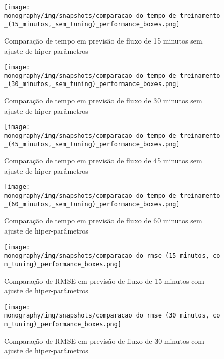 \begin{figure}[htbp]
    \centering
    \texttt{[image: monography/img/snapshots/comparacao\_do\_tempo\_de\_treinamento\_(15\_minutos,\_sem\_tuning)\_performance\_boxes.png]}
    \label{figure:comparacao_previsao_tempo_15_sem_tuning}
    \caption{Comparação de tempo em previsão de fluxo de 15 minutos sem ajuste de hiper-parâmetros}
\end{figure}

\begin{figure}[htbp]
    \centering
    \texttt{[image: monography/img/snapshots/comparacao\_do\_tempo\_de\_treinamento\_(30\_minutos,\_sem\_tuning)\_performance\_boxes.png]}
    \label{figure:comparacao_previsao_tempo_30_sem_tuning}
    \caption{Comparação de tempo em previsão de fluxo de 30 minutos sem ajuste de hiper-parâmetros}
\end{figure}

\begin{figure}[htbp]
    \centering
    \texttt{[image: monography/img/snapshots/comparacao\_do\_tempo\_de\_treinamento\_(45\_minutos,\_sem\_tuning)\_performance\_boxes.png]}
    \label{figure:comparacao_previsao_tempo_45_sem_tuning}
    \caption{Comparação de tempo em previsão de fluxo de 45 minutos sem ajuste de hiper-parâmetros}
\end{figure}

\begin{figure}[htbp]
    \centering
    \texttt{[image: monography/img/snapshots/comparacao\_do\_tempo\_de\_treinamento\_(60\_minutos,\_sem\_tuning)\_performance\_boxes.png]}
    \label{figure:comparacao_previsao_tempo_60_sem_tuning}
    \caption{Comparação de tempo em previsão de fluxo de 60 minutos sem ajuste de hiper-parâmetros}
\end{figure}

\begin{figure}[htbp]
    \centering
    \texttt{[image: monography/img/snapshots/comparacao\_do\_rmse\_(15\_minutos,\_com\_tuning)\_performance\_boxes.png]}
    \label{figure:comparacao_previsao_rmse_15_com_tuning}
    \caption{Comparação de RMSE em previsão de fluxo de 15 minutos com ajuste de hiper-parâmetros}
\end{figure}

\begin{figure}[htbp]
    \centering
    \texttt{[image: monography/img/snapshots/comparacao\_do\_rmse\_(30\_minutos,\_com\_tuning)\_performance\_boxes.png]}
    \label{figure:comparacao_previsao_rmse_30_com_tuning}
    \caption{Comparação de RMSE em previsão de fluxo de 30 minutos com ajuste de hiper-parâmetros}
\end{figure}

